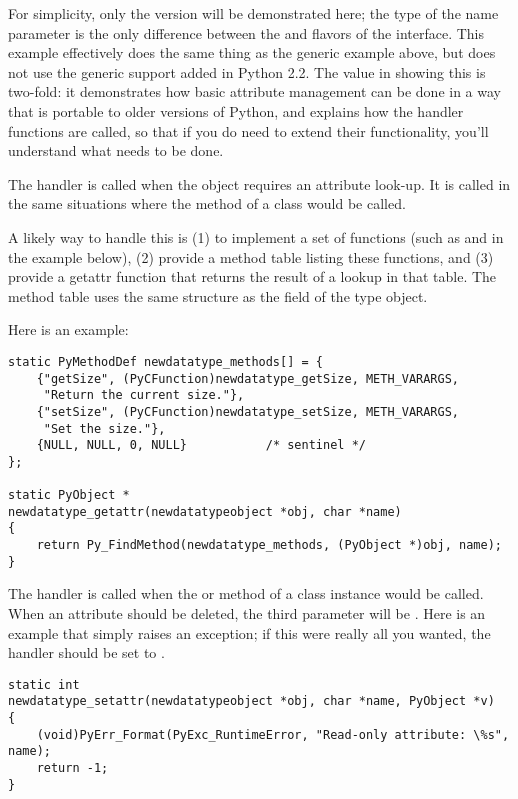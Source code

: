 For simplicity, only the  version will be demonstrated
here; the type of the name parameter is the only difference between
the  and  flavors of the interface.
This example effectively does the same thing as the generic example
above, but does not use the generic support added in Python 2.2.  The
value in showing this is two-fold: it demonstrates how basic attribute
management can be done in a way that is portable to older versions of
Python, and explains how the handler functions are called, so that if
you do need to extend their functionality, you'll understand what
needs to be done.

The  handler is called when the object requires an
attribute look-up.  It is called in the same situations where the
 method of a class would be called.

A likely way to handle this is (1) to implement a set of functions
(such as  and
 in the example below), (2) provide a
method table listing these functions, and (3) provide a getattr
function that returns the result of a lookup in that table.  The
method table uses the same structure as the  field
of the type object.

Here is an example:

\begin{verbatim}
static PyMethodDef newdatatype_methods[] = {
    {"getSize", (PyCFunction)newdatatype_getSize, METH_VARARGS,
     "Return the current size."},
    {"setSize", (PyCFunction)newdatatype_setSize, METH_VARARGS,
     "Set the size."},
    {NULL, NULL, 0, NULL}           /* sentinel */
};

static PyObject *
newdatatype_getattr(newdatatypeobject *obj, char *name)
{
    return Py_FindMethod(newdatatype_methods, (PyObject *)obj, name);
}
\end{verbatim}

The  handler is called when the
 or  method of a class
instance would be called.  When an attribute should be deleted, the
third parameter will be \NULL.  Here is an example that simply raises
an exception; if this were really all you wanted, the
 handler should be set to \NULL.

\begin{verbatim}
static int
newdatatype_setattr(newdatatypeobject *obj, char *name, PyObject *v)
{
    (void)PyErr_Format(PyExc_RuntimeError, "Read-only attribute: \%s", name);
    return -1;
}
\end{verbatim}


